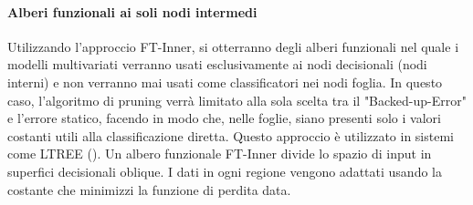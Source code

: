 \paragraph{Alberi funzionali ai soli nodi intermedi}
Utilizzando l'approccio FT-Inner, si otterranno degli alberi funzionali nel quale i modelli multivariati verranno usati esclusivamente ai nodi decisionali (nodi interni) e non verranno mai usati come classificatori nei nodi foglia. In questo caso, l'algoritmo di pruning verrà limitato alla sola scelta tra il "Backed-up-Error" e l'errore statico, facendo in modo che, nelle foglie, siano presenti solo i valori costanti utili alla classificazione diretta. Questo approccio è utilizzato in sistemi come LTREE (\cite{conf/icml/Gama97}). Un albero funzionale FT-Inner divide lo spazio di input in superfici decisionali oblique. I dati in ogni regione vengono adattati usando la costante che minimizzi la funzione di perdita data.

